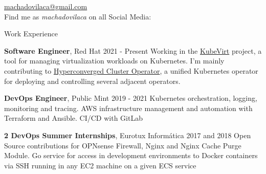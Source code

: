 \documentclass{resume}
\begin{document}
\begin{center}
    \href{mailto:machadovilaca@gmail.com}{machadovilaca@gmail.com} \hspace{0.1cm}
    \\
    Find me as \textit{machadovilaca} on all Social Media:
    \href{https://www.linkedin.com/in/machadovilaca}{\faLinkedin} \hspace{0.1cm}
    \href{https://github.com/machadovilaca}{\faGithub} \hspace{0.1cm}
    \href{https://gitlab.com/machadovilaca}{\faGitlab} \hspace{0.1cm}
\end{center}


\begin{rSection}{Work Experience}

\begin{rSubsection}
{\textbf{Software Engineer}, Red Hat \href{https://www.redhat.com}{\faLink}}{2021 - Present}{}{}
Working in the \href{https://github.com/kubevirt}{KubeVirt} project, a tool for managing virtualization workloads on Kubernetes. I'm mainly contributing to \href{https://github.com/kubevirt/hyperconverged-cluster-operator}{Hyperconverged Cluster Operator}, a unified Kubernetes operator for deploying and controlling several adjacent operators.
\end{rSubsection}

\begin{rSubsection}
{\textbf{DevOps Engineer}, Public Mint \href{https://publicmint.com/}{\faLink}}{2019 - 2021}{}{}
Kubernetes orchestration, logging, monitoring and tracing. AWS infrastructure management and automation with Terraform and Ansible. CI/CD with GitLab
\end{rSubsection}

\begin{rSubsection}
{\textbf{2 DevOps Summer Internships}, Eurotux Informática \href{https://eurotux.com/}{\faLink}}{2017 and 2018}{}{}
Open Source contributions for OPNsense Firewall, Nginx and Nginx Cache Purge Module. Go service for access in development environments to Docker containers via SSH running in any EC2 machine on a given ECS service
\end{rSubsection}

\end{rSection}
\end{document}
